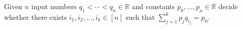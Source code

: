 \begin{problem}[%
	name={\(k\)-LDT},%
	label=problem:kldt,%
	restate={ProblemKLDT}%
]
 Given \(n\) input numbers \(q_1 < \cdots < q_n \in\mathbb{R}\)
 and constants
 $p_0, \ldots, p_n \in \mathbb{R}$
 decide whether there exists \(i_1, i_2,\ldots ,i_k \in [n]\) such that
 \(\sum_{j=1}^k p_j q_{i_j} = p_0\).
\end{problem}
